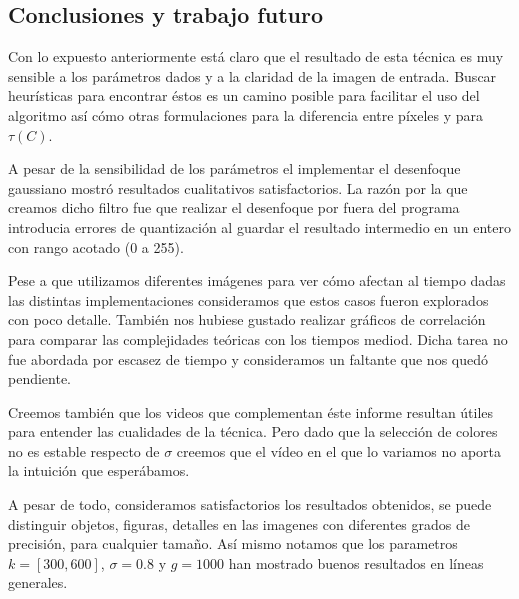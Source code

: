 \subsection{Conclusiones y trabajo futuro}

Con lo expuesto anteriormente está claro que el resultado de esta técnica es
muy sensible a los parámetros dados y a la claridad de la imagen de entrada.
Buscar heurísticas para encontrar éstos es un camino posible para facilitar el
uso del algoritmo así cómo otras formulaciones para la diferencia entre píxeles
y para $\tau(C)$.

A pesar de la sensibilidad de los parámetros el implementar el desenfoque
gaussiano mostró resultados cualitativos satisfactorios. La razón por la que
creamos dicho filtro fue que realizar el desenfoque por fuera del programa
introducia errores de quantización al guardar el resultado intermedio en un
entero con rango acotado (0 a 255).

Pese a que utilizamos diferentes imágenes para ver cómo afectan al tiempo dadas
las distintas implementaciones consideramos que estos casos fueron explorados
con poco detalle. También nos hubiese gustado realizar gráficos de correlación
para comparar las complejidades teóricas con los tiempos mediod.  Dicha tarea
no fue abordada por escasez de tiempo y consideramos un faltante que nos quedó
pendiente.

Creemos también que los videos que complementan éste informe resultan útiles
para entender las cualidades de la técnica. Pero dado que la selección de
colores no es estable respecto de $\sigma$ creemos que el vídeo en el que lo
variamos no aporta la intuición que esperábamos.

A pesar de todo, consideramos satisfactorios los resultados obtenidos, se puede
distinguir objetos, figuras, detalles en las imagenes con diferentes grados de
precisión, para cualquier tamaño. Así mismo notamos que los parametros $k =
[300, 600]$, $\sigma = 0.8$ y $g = 1000$ han mostrado buenos resultados en
líneas generales.
